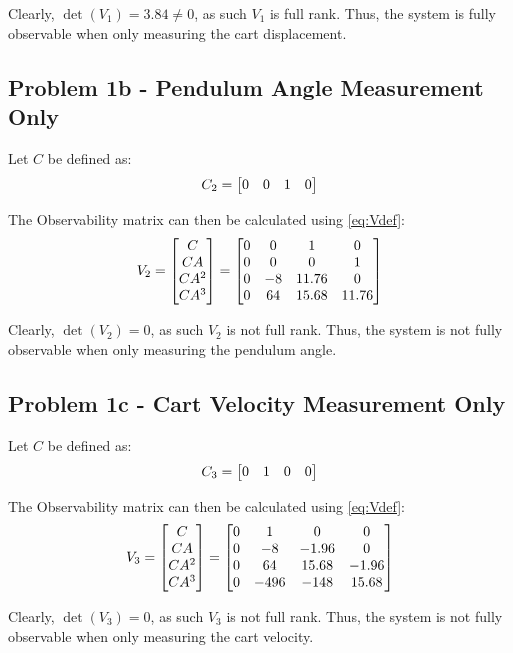 \documentclass[]{article}
\begin{document}
		Clearly, $\det(V_1) = 3.84 \neq 0$, as such $V_1$ is full rank. Thus, the system is fully observable when only measuring the cart displacement.
	
	\subsection{Problem 1b - Pendulum Angle Measurement Only}
		Let $C$ be defined as:
		\begin{equation}
			C_2 = \mqty[0	&0	&1	&0]
		\end{equation}
		
		The Observability matrix can then be calculated using \eqref{eq:Vdef}:
		\begin{equation}
			V_2 = \mqty[C\\ CA\\ CA^2\\ CA^3]
			= \mqty[0	&0	&1		&0\\
					0	&0	&0		&1\\
					0	&-8	&11.76	&0\\
					0	&64	&15.68	&11.76] \label{eq:v2def}
		\end{equation}
		
		Clearly, $\det(V_2) = 0$, as such $V_2$ is not full rank. Thus, the system is not fully observable when only measuring the pendulum angle.
	
	\subsection{Problem 1c - Cart Velocity Measurement Only}
		Let $C$ be defined as:
		\begin{equation}
			C_3 = \mqty[0	&1	&0	&0]
		\end{equation}
		
		The Observability matrix can then be calculated using \eqref{eq:Vdef}:
		\begin{equation}
			V_3 = \mqty[C\\ CA\\ CA^2\\ CA^3]
			= \mqty[0	&1		&0		&0\\
					0	&-8		&-1.96	&0\\
					0	&64		&15.68	&-1.96\\
					0	&-496	&-148	&15.68]\label{eq:v3def}
		\end{equation}
		
		Clearly, $\det(V_3) = 0$, as such $V_3$ is not full rank. Thus, the system is not fully observable when only measuring the cart velocity.
		
\end{document}
